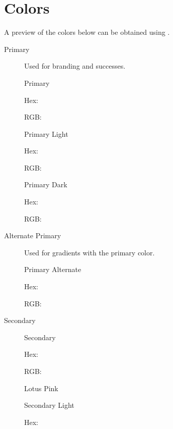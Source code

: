 \documentclass[letterpaper,10pt,english]{sphinxmanual}
\begin{document}
\section{Colors}
\label{\detokenize{design/colors:colors}}\label{\detokenize{design/colors::doc}}
A preview of the colors below can be obtained using .
\begin{description}
\item[{Primary}] \leavevmode
Used for branding and successes.


Primary

Hex: 

RGB: 


Primary Light

Hex: 

RGB: 


Primary Dark

Hex: 

RGB: 

\item[{Alternate Primary}] \leavevmode
Used for gradients with the primary color.


Primary Alternate

Hex: 

RGB: 

\item[{Secondary}] \leavevmode
{}

Secondary

Hex: 

RGB: 

Lotus Pink

Secondary Light

Hex: 


\end{description}
\end{document}
